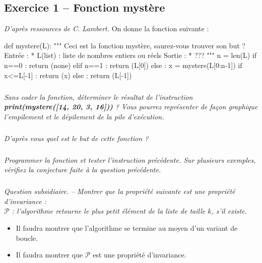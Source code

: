 \documentclass[10pt,fleqn]{article} %
\begin{document}

\vspace{10cm}
\pagestyle{fancy}
\thispagestyle{plain}


\def\columnseprulecolor{\color{ocre}}
\setlength{\columnseprule}{0.4pt} 
\begin{multicols}{2}

\subsection*{Exercice 1 -- Fonction mystère}
\textit{D'après ressources de C. Lambert.}
On donne la fonction suivante : 
\begin{py}
\begin{python}
def mystere(L):
    """
    Ceci est la fonction mystère, saurez-vous trouver 
    son but ?
    Entrée : 
        * L(list) : liste de nombres entiers ou réels
    Sortie : 
        * ??? 
    """
    n = len(L)
    if n==0 :
        return (none)
    elif n==1 :
        return (L[0])
    else :
        x = mystere(L[0:n-1])
        if x<=L[-1] :
            return (x)
        else : 
            return (L[-1])
\end{python}
\end{py}

\subparagraph{}
\textit{Sans coder la fonction, déterminer le résultat de l'instruction \textbf{print(mystere([14, 20, 3, 16]))} ? Vous pourrez représenter de façon graphique l'empilement et le dépilement de la pile d'exécution.}

\subparagraph{}
\textit{D'après vous quel est le but de cette fonction ?}

\subparagraph{}
\textit{Programmer la fonction et tester l'instruction précédente. Sur plusieurs exemples, vérifiez la conjecture faite à la question précédente.}


\subparagraph{}
\textit{Question subsidiaire. -- Montrer que la propriété suivante est une propriété d'invariance :\\
$\mathcal{P}$ : l'algorithme retourne le plus petit élément de la liste de taille $k$, s'il existe.}

\begin{rem}
\begin{itemize}
\item Il faudra montrer que l'algorithme se termine au moyen d'un variant de boucle. 
\item Il faudra montrer que $\mathcal{P}$ est une propriété d'invariance. 
\end{itemize}
\end{rem}


\end{multicols}
\end{document}

